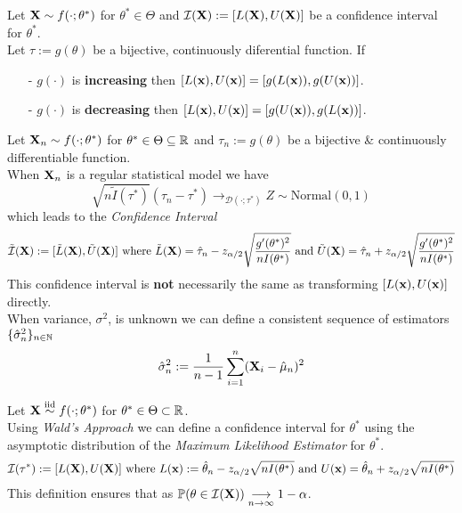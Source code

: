 \documentclass[11pt,a4paper]{article}
\begin{document}
Let $\textbf{X}\sim f(\cdot;\theta^*)$ for $\theta^*\in\Theta$ and $\mathcal{I}(\textbf{X}):=[L(\textbf{X}),U(\textbf{X})]$ be a confidence interval for $\theta^*$.\\
Let $\tau:=g(\theta)$ be a bijective, continuously diferential function. If
\begin{itemize}
	\item[-] $g(\cdot)$ is \textbf{increasing} then $[L(\textbf{x}),U(\textbf{x})]=[g(L(\textbf{x})),g(U(\textbf{x}))]$.
	\item[-] $g(\cdot)$ is \textbf{decreasing} then $[L(\textbf{x}),U(\textbf{x})]=[g(U(\textbf{x})),g(L(\textbf{x}))]$.
\end{itemize}

Let $\textbf{X}_n\sim f(\cdot;\theta^*)$ for $\theta^*\in\Theta\subseteq\mathbb{R}$ and $\tau_n:=g(\theta)$ be a bijective \& continuously differentiable function.\\
When $\textbf{X}_n$ is a regular statistical model we have
$$\sqrt{n\tilde{I}(\tau^*)}(\hat\tau_n-\tau^*)\to_{\mathcal{D}(\cdot;\tau^*)}Z\sim\text{Normal}(0,1)$$
which leads to the \textit{Confidence Interval}
$$\tilde{\mathcal{I}}(\textbf{X}):=[\tilde{L}(\textbf{X}),\tilde{U}(\textbf{X})]\text{ where }\tilde{L}(\textbf{X})=\hat\tau_n-z_{\alpha/2}\sqrt{\dfrac{g'(\theta^*)^2}{nI(\theta^*)}}\text{ and }\tilde{U}(\textbf{X})=\hat\tau_n+z_{\alpha/2}\sqrt{\dfrac{g'(\theta^*)^2}{nI(\theta^*)}}$$
\nb This confidence interval is \textbf{not} necessarily the same as transforming $[L(\textbf{x}),U(\textbf{x})]$ directly.\\

When variance, $\sigma^2$, is unknown we can define a consistent sequence of estimators $\{\hat\sigma^2_n\}_{n\in\mathbb{N}}$ 
$$\hat\sigma_n^2:=\frac{1}{n-1}\sum_{i=1}^n(\textbf{X}_i-\hat\mu_n)^2$$

Let $\textbf{X}\overset{\text{iid}}{\sim} f(\cdot;\theta^*)$ for $\theta^*\in\Theta\subset\mathbb{R}$.\\
Using \textit{Wald's Approach} we can define a confidence interval for $\theta^*$ using the asymptotic distribution of the \textit{Maximum Likelihood Estimator} for $\theta^*$.
$$\mathcal{I}(\tau^*):=[L(\textbf{X}),U(\textbf{X})]\text{ where } L(\textbf{x}):=\hat\theta_n-z_{\alpha/2}\sqrt{nI(\theta^*)}\text{ and }U(\textbf{x})=\hat\theta_n+z_{\alpha/2}\sqrt{nI(\theta^*)}$$
\nb This definition ensures that as $\mathbb{P}(\theta\in\mathcal{I}(\textbf{X}))\underset{n\to\infty}{\longrightarrow}1-\alpha$.\\
\end{document}
